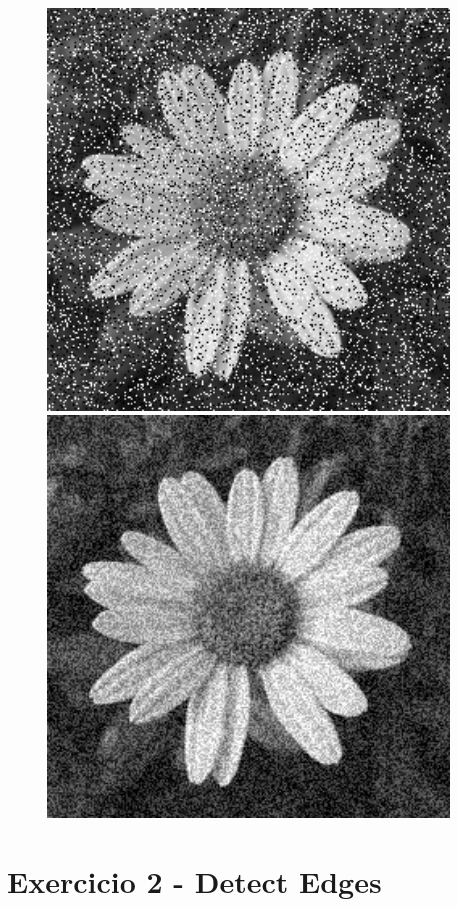\documentclass[a4paper]{report}
\begin{document}
\begin{figure}[H]
\centering
\begin{minipage}{.5\textwidth}
  \centering
    \includegraphics[width=0.95\textwidth]{images/flower_salt-n-pepper_0.2.png}
\end{minipage}%
\begin{minipage}{.5\textwidth}
  \centering
  \includegraphics[width=0.95\textwidth]{images/flower_gaussian_0.2.png}
\end{minipage}
\end{figure}

\chapter{Exercicio 2 - Detect Edges}
\end{document}
